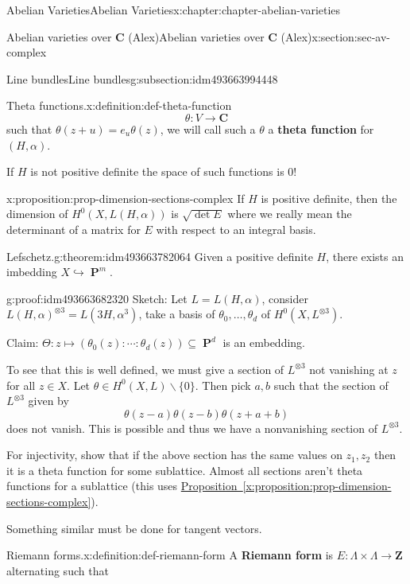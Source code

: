 \documentclass[oneside,10pt,]{book}
\newcommand{\terminology}[1]{\textbf{#1}}
\numberwithin{equation}{section}
\newcommand{\ZZ}{\mathbf{Z}}
\newcommand{\CC}{\mathbf{C}}
\DeclareMathOperator{\PP}{\mathbf{P}}
\begin{document}
\begin{chapterptx}{Abelian Varieties}{}{Abelian Varieties}{}{}{x:chapter:chapter-abelian-varieties}
\begin{sectionptx}{Abelian varieties over \(\CC\) (Alex)}{}{Abelian varieties over \(\CC\) (Alex)}{}{}{x:section:sec-av-complex}
\begin{subsectionptx}{Line bundles}{}{Line bundles}{}{}{g:subsection:idm493663994448}
\begin{definition}{Theta functions.}{x:definition:def-theta-function}
\begin{equation*}
\theta \colon V \to \CC
\end{equation*}
such that \(\theta(z+ u) = e_u \theta(z)\), we will call such a \(\theta\) a \terminology{theta function} for \((H,\alpha)\).%
\end{definition}
If \(H\) is not positive definite the space of such functions is 0!%
\begin{proposition}{}{}{x:proposition:prop-dimension-sections-complex}%
If \(H\) is positive definite, then the dimension of \(H^0(X, L(H,\alpha))\) is \(\sqrt{\det E}\) where we really mean the determinant of a matrix for \(E\) with respect to an integral basis.%
\end{proposition}
\begin{theorem}{Lefschetz.}{}{g:theorem:idm493663782064}%
Given a positive definite \(H\), there exists an imbedding \(X \hookrightarrow \PP^m\).%
\end{theorem}
\begin{proofptx}{}{g:proof:idm493663682320}
Sketch: Let \(L = L(H,\alpha)\), consider \(L(H,\alpha)^{\otimes 3} = L(3H, \alpha^3)\), take a basis of \(\theta_0,\ldots, \theta_d\) of \(H^0(X, L^{\otimes 3})\).%
\par
Claim: \(\Theta\colon z\mapsto (\theta_0(z) :\cdots :\theta_d (z)) \subseteq \PP^d\) is an embedding.%
\par
To see that this is well defined, we must give a section of \(L^{\otimes 3}\) not vanishing at \(z\) for all \(z\in X\). Let \(\theta \in H^0(X,L)\smallsetminus \{0\}\). Then pick \(a,b\) such that the section of \(L^{\otimes 3}\) given by%
\begin{equation*}
\theta(z-a)\theta(z-b) \theta(z+ a+b)
\end{equation*}
does not vanish. This is possible and thus we have a nonvanishing section of \(L^{\otimes 3}\).%
\par
For injectivity, show that if the above section has the same values on \(z_1,z_2\) then it is a theta function for some sublattice. Almost all sections aren't theta functions for a sublattice (this uses \hyperref[x:proposition:prop-dimension-sections-complex]{Proposition~\ref{x:proposition:prop-dimension-sections-complex}}).%
\par
Something similar must be done for tangent vectors.%
\end{proofptx}
\begin{definition}{Riemann forms.}{x:definition:def-riemann-form}%
A \terminology{Riemann form} is \(E\colon \Lambda \times \Lambda \to \ZZ\) alternating such that%

\end{definition}
\end{subsectionptx}
\end{sectionptx}
\end{chapterptx}
\end{document}
